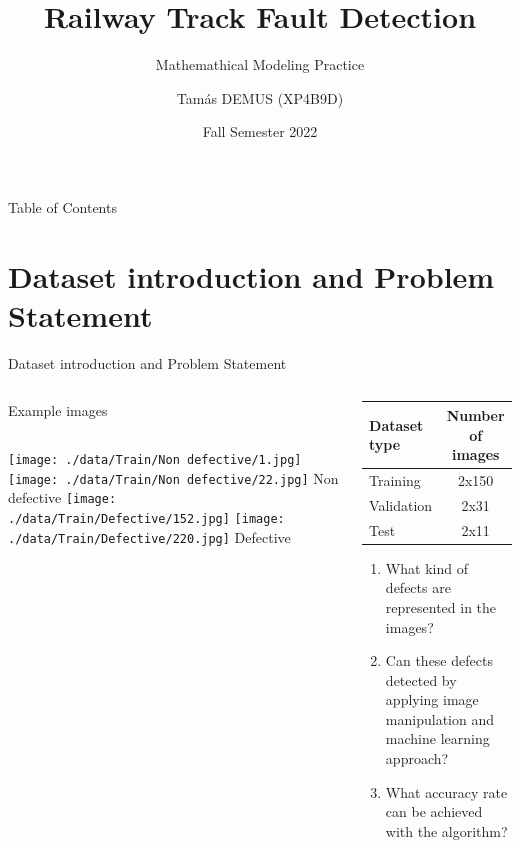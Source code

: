 \documentclass[aspectratio=169]{beamer}
\title{Railway Track Fault Detection}
\subtitle{Mathemathical Modeling Practice}
\author{Tamás DEMUS (XP4B9D)}
\date{Fall Semester 2022}
\begin{document}
\maketitle

\begin{frame}{Table of Contents}
    \tableofcontents
\end{frame}

\section{Dataset introduction and Problem Statement}
\begin{frame}{Dataset introduction and Problem Statement}
    \begin{columns}[c]
        \begin{exampleblock}{Example images}
            \begin{columns}[c]
                \texttt{[image: ./data/Train/Non defective/1.jpg]}
                \texttt{[image: ./data/Train/Non defective/22.jpg]}
                \centering
                Non defective
                \texttt{[image: ./data/Train/Defective/152.jpg]}
                \texttt{[image: ./data/Train/Defective/220.jpg]}
                \centering
                Defective
            \end{columns}
        \end{exampleblock}
        \begin{block}{}
            \begin{table}[!ht]
                \begin{tabular}{l c}
                    Dataset type & Number of images \\
                    \hline
                    Training     & 2x150            \\
                    Validation   & 2x31             \\
                    Test         & 2x11             \\
                \end{tabular}
            \end{table}
            \begin{enumerate}[label=Q\arabic*]
                \item \label{itm:Q1} What kind of defects are represented in the images?
                \item \label{itm:Q2} Can these defects detected by applying image manipulation
                      and machine learning approach?
                \item \label{itm:Q3} What accuracy rate can be achieved with the algorithm?
            \end{enumerate}
        \end{block}
    \end{columns}
\end{frame}
\end{document}
